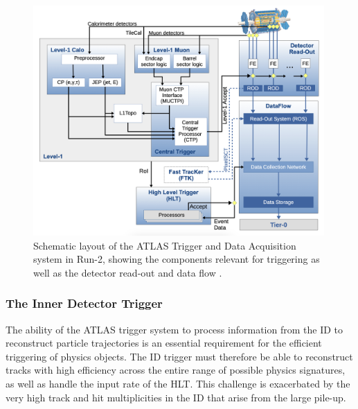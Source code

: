 \begin{figure}[htb!]
    \centering
    \includegraphics[width=0.99\textwidth]{images/2-LHC-ATLAS/trigger-run-2.png}
    \caption{Schematic layout of the ATLAS Trigger and Data Acquisition system in Run-2, showing the components relevant for triggering as well as the detector read-out and data flow \cite{collaboration_2020}.}
    \label{fig:trigger-run-2-setup}
\end{figure}


\subsubsection{The Inner Detector Trigger}

The ability of the ATLAS trigger system to process information from the ID to reconstruct particle trajectories is an essential requirement for the efficient triggering of physics objects. The ID trigger must therefore be able to reconstruct tracks with high efficiency across the entire range of possible physics signatures, as well as handle the input rate of the HLT. This challenge is exacerbated by the very high track and hit multiplicities in the ID that arise from the large pile-up. 

